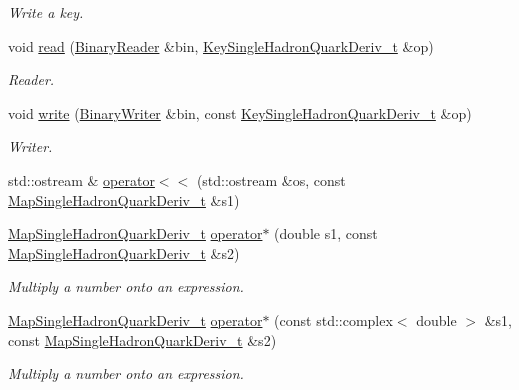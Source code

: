 \begin{DoxyCompactItemize}
\begin{DoxyCompactList}\small\item\em Write a key. \end{DoxyCompactList}\item 
void \mbox{\hyperlink{namespaceHadron_a14726c9fa76350682d7ef85457af512b}{read}} (\mbox{\hyperlink{classADATIO_1_1BinaryReader}{Binary\+Reader}} \&bin, \mbox{\hyperlink{structHadron_1_1KeySingleHadronQuarkDeriv__t}{Key\+Single\+Hadron\+Quark\+Deriv\+\_\+t}} \&op)
\begin{DoxyCompactList}\small\item\em Reader. \end{DoxyCompactList}\item 
void \mbox{\hyperlink{namespaceHadron_a3d7c7b8fcc5310fee44294d5900816fb}{write}} (\mbox{\hyperlink{classADATIO_1_1BinaryWriter}{Binary\+Writer}} \&bin, const \mbox{\hyperlink{structHadron_1_1KeySingleHadronQuarkDeriv__t}{Key\+Single\+Hadron\+Quark\+Deriv\+\_\+t}} \&op)
\begin{DoxyCompactList}\small\item\em Writer. \end{DoxyCompactList}\item 
std\+::ostream \& \mbox{\hyperlink{namespaceHadron_a800dbac093bd07f370068965de5868b3}{operator$<$$<$}} (std\+::ostream \&os, const \mbox{\hyperlink{namespaceHadron_aa588220689caea8a6aad4d0296526e6b}{Map\+Single\+Hadron\+Quark\+Deriv\+\_\+t}} \&s1)
\item 
\mbox{\hyperlink{namespaceHadron_aa588220689caea8a6aad4d0296526e6b}{Map\+Single\+Hadron\+Quark\+Deriv\+\_\+t}} \mbox{\hyperlink{namespaceHadron_a559c56047e1679b244bd6770b9f3c3b8}{operator$\ast$}} (double s1, const \mbox{\hyperlink{namespaceHadron_aa588220689caea8a6aad4d0296526e6b}{Map\+Single\+Hadron\+Quark\+Deriv\+\_\+t}} \&s2)
\begin{DoxyCompactList}\small\item\em Multiply a number onto an expression. \end{DoxyCompactList}\item 
\mbox{\hyperlink{namespaceHadron_aa588220689caea8a6aad4d0296526e6b}{Map\+Single\+Hadron\+Quark\+Deriv\+\_\+t}} \mbox{\hyperlink{namespaceHadron_aee77eafb416d7080a53fa0bd52528d11}{operator$\ast$}} (const std\+::complex$<$ double $>$ \&s1, const \mbox{\hyperlink{namespaceHadron_aa588220689caea8a6aad4d0296526e6b}{Map\+Single\+Hadron\+Quark\+Deriv\+\_\+t}} \&s2)
\begin{DoxyCompactList}\small\item\em Multiply a number onto an expression. \end{DoxyCompactList}\item 

\end{DoxyCompactItemize}
